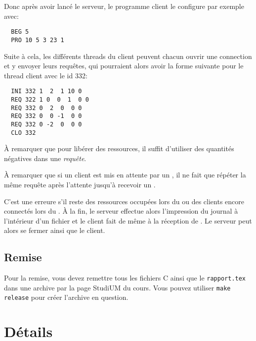 \documentclass{article}
\begin{document}
Donc après avoir lancé le serveur, le programme client le configure par
exemple avec:
\begin{verbatim}
  BEG 5
  PRO 10 5 3 23 1
\end{verbatim}
Suite à cela, les différents threads du client peuvent chacun ouvrir une
connection et y envoyer leurs requêtes, qui pourraient alors avoir la forme
suivante pour le thread client avec le id 332:
\begin{verbatim}
  INI 332 1  2  1 10 0
  REQ 322 1 0  0  1  0 0
  REQ 332 0  2  0  0 0
  REQ 332 0  0 -1  0 0
  REQ 332 0 -2  0  0 0
  CLO 332
\end{verbatim}

À remarquer que pour libérer des ressources, il suffit d'utiliser des
quantités négatives dans une \emph{requête}.

À remarquer que si un client est mis en attente par un , il ne fait
que répéter la même requête après l'attente jusqu'à recevoir un .

C'est une erreure s’il reste des ressources occupées lors du  ou des
clients encore connectés lors du .  À la fin, le serveur effectue
alors l’impression du journal à l’intérieur d’un fichier et le client fait
de même à la réception de .  Le serveur peut alors se fermer ainsi
que le client.

\subsection{Remise}

Pour la remise, vous devez remettre tous les fichiers C ainsi que le
\texttt{rapport.tex} dans une archive  par la page StudiUM du cours.  Vous pouvez utiliser \texttt{make release} pour
créer l'archive en question.  

\section{Détails}
\end{document}
